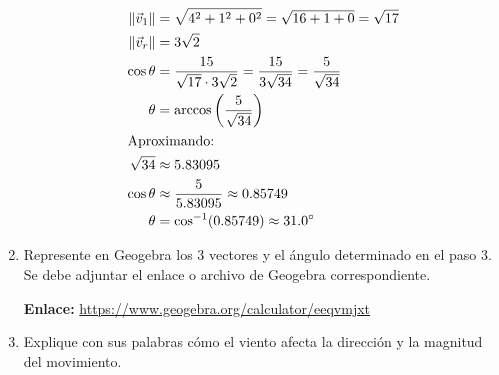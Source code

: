 \documentclass{article}
\begin{document}
\begin{enumerate}[label=\textbf{\arabic*.}, itemsep=0.8em, leftmargin=2em]
\begin{center}
{\begin{minipage}{0.9\textwidth}
\begin{align*}
    \|\vec v_1\| &= \sqrt{4^2 + 1^2 + 0^2} = \sqrt{16 + 1 + 0} = \sqrt{17} \\
    \|\vec v_r\| &= 3\sqrt{2} \\
    \cos \theta &= \frac{15}{\sqrt{17} \cdot 3\sqrt{2}} = \frac{15}{3\sqrt{34}} = \frac{5}{\sqrt{34}} \\
    	\theta &= \arccos\left(\frac{5}{\sqrt{34}}\right) \\
    \intertext{Aproximando:}
    \sqrt{34} &\approx 5.83095 \\
    \cos\theta &\approx \frac{5}{5.83095} \approx 0.85749 \\
      	\theta &= \cos^{-1}(0.85749) \approx 31.0^\circ
    \end{align*}
    \end{minipage}}
    \end{center}
    \begin{center}
    \end{center}
  \item Represente en Geogebra los 3 vectores y el ángulo determinado en el paso 3. Se debe adjuntar el enlace o archivo de Geogebra correspondiente.
  \begin{center}
  \colorbox{gray!5}{\parbox{0.95\textwidth}{\vspace{0.2cm}\centering
  	\textbf{Enlace:} \url{https://www.geogebra.org/calculator/eeqvmjxt}\vspace{0.2cm}}}
  \end{center}
	\item Explique con sus palabras cómo el viento afecta la dirección y la magnitud del movimiento.
\end{enumerate}
\end{document}
